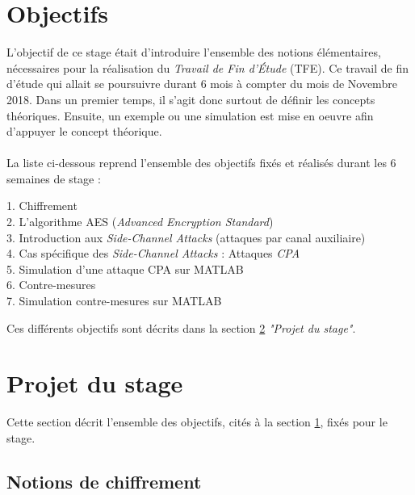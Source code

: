 \documentclass[10pt, oneside, a4paper]{article}
\begin{document}
\newpage
\section{Objectifs }
\label{sec:objectifs}

 
L'objectif de ce stage était d'introduire l'ensemble des notions élémentaires, nécessaires pour la réalisation du \textit{Travail de Fin d'Étude} (TFE). Ce travail de fin d'étude qui allait se poursuivre durant 6 mois à compter du mois de Novembre 2018. Dans un premier temps, il s'agit donc surtout de définir les concepts théoriques. Ensuite, un exemple ou une simulation est mise en oeuvre afin d'appuyer le concept théorique.\\ \\
La liste ci-dessous reprend l'ensemble des objectifs fixés et réalisés durant les 6 semaines de stage : 
\begin{description}
\item[1. Chiffrement] 
\item[2. L'algorithme AES (\textit{Advanced Encryption Standard})]
\item[3. Introduction aux \textit{Side-Channel Attacks} (attaques par canal auxiliaire)]
\item[4. Cas spécifique des \textit{Side-Channel Attacks} : Attaques \textit{CPA}] 
\item[5. Simulation d'une attaque CPA sur MATLAB] 
\item[6. Contre-mesures] 
\item[7. Simulation contre-mesures sur MATLAB] 
\end{description}
Ces différents objectifs sont décrits dans la section \ref{sec:Projet} \textit{"Projet du stage"}.

\section{Projet du stage}
\label{sec:Projet}

Cette section décrit l'ensemble des objectifs, cités à la section \ref{sec:objectifs}, fixés pour le stage. 

\subsection{Notions  de chiffrement}
\end{document}
